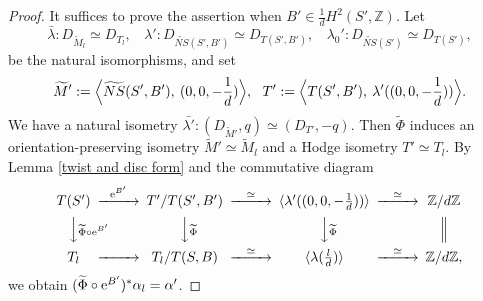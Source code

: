 \documentclass{article}
\theoremstyle{plain}
\theoremstyle{definition}
\theoremstyle{remark}
\newcommand{\Z}{{\mathbb Z}}
\begin{document}
\begin{proof}
It suffices to prove the assertion 
when $B' \in \frac{1}{d}H^{2}(S', {\Z})$. 
Let 
\begin{equation*} 
\bar{\lambda} : 
                D_{\widetilde{M}_{l}} \simeq D_{T_{l}}, \: \: \:  \: 
\lambda ' : 
                D_{\widetilde{NS}(S', B')} \simeq D_{T(S', B')},  \: \: \: \:    
\lambda _{0}' : 
                D_{\widetilde{NS}(S')} \simeq D_{T(S')},  
\end{equation*}
be the natural isomorphisms, 
and set 
\begin{equation*}
\widetilde{M}' := 
                  \Bigl\langle \widetilde{NS}(S', B'), \: (0, 0, -\frac{1}{d}) \Bigr\rangle , \: \: \: 
T' := 
                  \Bigl\langle  T(S', B'), \: \lambda '((0, 0, -\frac{1}{d}))   \Bigr\rangle .
\end{equation*} 
We have a natural isometry 
$\bar{\lambda '} : (D_{\widetilde{M}'}, q) \simeq (D_{T'}, -q)$. 
Then 
$\widetilde{\Phi}$ induces 
an orientation-preserving isometry 
$\widetilde{M}' \simeq \widetilde{M}_{l}$ 
and a Hodge isometry 
$T' \simeq T_{l}$. 
By Lemma \ref{twist and disc form} and the commutative diagram 
$$
\CD 
 T(S')  @>{\rm e\/}^{B'}>> T'/T(S', B') @>\simeq >> \langle \lambda '((0, 0, -\frac{1}{d})) \rangle @>\simeq >> {\Z}/d{\Z} 
 \\
@VV\widetilde{\Phi}\circ {\rm e\/}^{B'}V      @VV\widetilde{\Phi}V    @VV\widetilde{\Phi}V        @|     \\ 
 T_{l}  @>>> T_{l}/T(S, B)      @>\simeq >> \langle \lambda (\frac{l}{d}) \rangle @>\simeq >> {\Z}/d{\Z},  
\endCD
$$      
we obtain 
$(\widetilde{\Phi} \circ {\rm e\/}^{B'})^{\ast}\alpha _{l} = \alpha '$. 







\end{proof}
\end{document}
